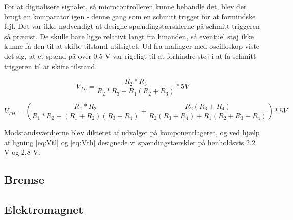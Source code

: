 For at digitalisere signalet, så microcontrolleren kunne behandle det, blev der brugt en komparator igen - denne gang som en schmitt trigger for at formindske fejl. Det var ikke nødvendigt at designe spændingstærsklerne på schmitt triggeren så præcist. De skulle bare ligge relativt langt fra hinanden, så eventuel støj ikke kunne få den til at skifte tilstand utilsigtet. Ud fra  målinger med oscilloskop viste det sig, at et spænd på over 0.5 V var rigeligt til at forhindre støj i at få schmitt triggeren til at skifte tilstand.

\begin{equation}
V_{TL} = \dfrac{R_{2}*R_{3}}{R_{2}*R_{3}+R_{1}(R_{2}+R_{3})}*5V
\label{eq:Vtl}
\end{equation}


\begin{equation}
V_{TH} = \left(\dfrac{R_{1}*R_{2}}{R_{1}*R_{2}+(R_{1}+R_{2})(R_{3}+R_{4})} + \dfrac{R_{2}(R_{3}+R_{4})}{R_{2}(R_{3}+R_{4})+R_{1}(R_{2}+R_{3}+R_{4})}\right)*5V
\label{eq:Vth}
\end{equation}



Modstandsværdierne blev dikteret af udvalget på komponentlageret, og ved hjælp af ligning \eqref{eq:Vtl} og \eqref{eq:Vth} designede vi spændingstærskler på henholdsvis 2.2 V og 2.8 V. 

\subsection{Bremse}

\subsection{Elektromagnet}